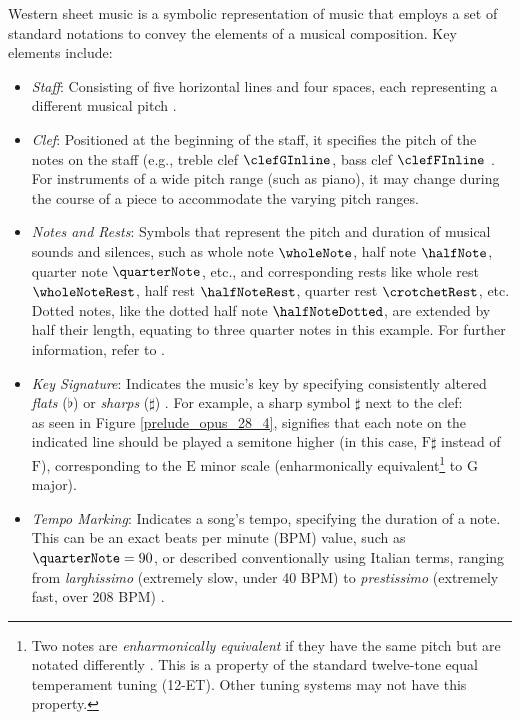 Western sheet music is a symbolic representation of music that employs a set of standard notations to convey the elements of a musical composition. Key elements include:
\begin{itemize}
   \item \emph{Staff}: Consisting of five horizontal lines and four spaces, each representing a different musical pitch \cite[p.~27]{Read1969}.
   \item \emph{Clef}: Positioned at the beginning of the staff, it specifies the pitch of the notes on the staff (e.g., treble clef $\clefGInline$, bass clef $\clefFInline$ \cite[p.~51--55]{Read1969}. For instruments of a wide pitch range (such as piano), it may change during the course of a piece to accommodate the varying pitch ranges.
   \item \emph{Notes and Rests}: Symbols that represent the pitch and duration of musical sounds and silences, such as whole note $\wholeNote$, half note $\halfNote$, quarter note $\quarterNote$, etc., and corresponding rests like whole rest $\wholeNoteRest$, half rest $\halfNoteRest$, quarter rest $\crotchetRest$, etc. Dotted notes, like the dotted half note $\halfNoteDotted$, are extended by half their length, equating to three quarter notes in this example. For further information, refer to \cite[p.~64--65, 96, 103, 113--114]{Read1969}.
   \item \emph{Key Signature}: Indicates the music's key by specifying consistently altered \emph{flats} ($\flat$) or \emph{sharps} ($\sharp$) \cite[p.~135--136]{Read1969}. For example, a sharp symbol $\sharp$ next to the clef: $$$$ as seen in Figure \ref{prelude_opus_28_4}, signifies that each note on the indicated line should be played a semitone higher (in this case, $\textrm{F}\sharp$ instead of $\textrm{F}$), corresponding to the $\textrm{E}$ minor scale (enharmonically equivalent\footnote{Two notes are \emph{enharmonically equivalent} if they have the same pitch but are notated differently \cite[p.~10]{Kostka1994}. This is a property of the standard twelve-tone equal temperament tuning (12-ET). Other tuning systems may not have this property.} to $\textrm{G}$ major).
   \item \emph{Tempo Marking}: Indicates a song's tempo, specifying the duration of a note. This can be an exact beats per minute (BPM) value, such as $\quarterNote =90$, or described conventionally using Italian terms, ranging from \emph{larghissimo} (extremely slow, under 40 BPM) to \emph{prestissimo} (extremely fast, over 208 BPM) \cite[p.~276--277]{Read1969}.

\end{itemize}
